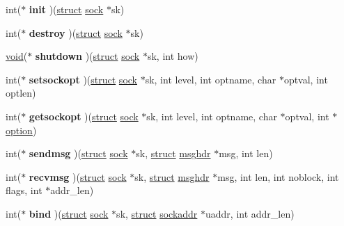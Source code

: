 \begin{DoxyCompactItemize}
\item 
\mbox{\label{structproto_abc5a4609a8021641199806b4b76a5416}} 
int($\ast$ {\bfseries init} )(\hyperlink{interfacestruct}{struct} \hyperlink{structsock}{sock} $\ast$sk)
\item 
\mbox{\label{structproto_a6a6fca425be64d32117a08bf440a318f}} 
int($\ast$ {\bfseries destroy} )(\hyperlink{interfacestruct}{struct} \hyperlink{structsock}{sock} $\ast$sk)
\item 
\mbox{\label{structproto_ae6f7255b196c125a64f3bcf3a3d26f04}} 
\hyperlink{interfacevoid}{void}($\ast$ {\bfseries shutdown} )(\hyperlink{interfacestruct}{struct} \hyperlink{structsock}{sock} $\ast$sk, int how)
\item 
\mbox{\label{structproto_a10ffb126f5fbb920337c3bbc7811257f}} 
int($\ast$ {\bfseries setsockopt} )(\hyperlink{interfacestruct}{struct} \hyperlink{structsock}{sock} $\ast$sk, int level, int optname, char $\ast$optval, int optlen)
\item 
\mbox{\label{structproto_a12b657087ccbe882489003b7e253c2b8}} 
int($\ast$ {\bfseries getsockopt} )(\hyperlink{interfacestruct}{struct} \hyperlink{structsock}{sock} $\ast$sk, int level, int optname, char $\ast$optval, int $\ast$\hyperlink{structoption}{option})
\item 
\mbox{\label{structproto_a146cb6cae0d7f1e544f8025913ffe69a}} 
int($\ast$ {\bfseries sendmsg} )(\hyperlink{interfacestruct}{struct} \hyperlink{structsock}{sock} $\ast$sk, \hyperlink{interfacestruct}{struct} \hyperlink{structmsghdr}{msghdr} $\ast$msg, int len)
\item 
\mbox{\label{structproto_a7ad821b7be10a8134235a0ff33cbeeb1}} 
int($\ast$ {\bfseries recvmsg} )(\hyperlink{interfacestruct}{struct} \hyperlink{structsock}{sock} $\ast$sk, \hyperlink{interfacestruct}{struct} \hyperlink{structmsghdr}{msghdr} $\ast$msg, int len, int noblock, int flags, int $\ast$addr\+\_\+len)
\item 
\mbox{\label{structproto_a3b6507ea05b3ce88addd236e07bcfcfb}} 
int($\ast$ {\bfseries bind} )(\hyperlink{interfacestruct}{struct} \hyperlink{structsock}{sock} $\ast$sk, \hyperlink{interfacestruct}{struct} \hyperlink{structsockaddr}{sockaddr} $\ast$uaddr, int addr\+\_\+len)

\end{DoxyCompactItemize}
